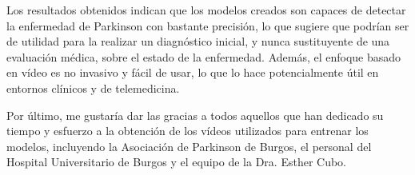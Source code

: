 Los resultados obtenidos indican que los modelos creados son capaces de detectar
la enfermedad de Parkinson con bastante precisión, lo que sugiere que podrían
ser de utilidad para la realizar un diagnóstico inicial, y nunca sustituyente de
una evaluación médica, sobre el estado de la enfermedad. Además, el enfoque
basado en vídeo es no invasivo y fácil de usar, lo que lo hace potencialmente
útil en entornos clínicos y de telemedicina.

Por último, me gustaría dar las gracias a todos aquellos que han dedicado su
tiempo y esfuerzo a la obtención de los vídeos utilizados para entrenar los
modelos, incluyendo la Asociación de Parkinson de Burgos, el personal del
Hospital Universitario de Burgos y el equipo de la Dra. Esther Cubo.
